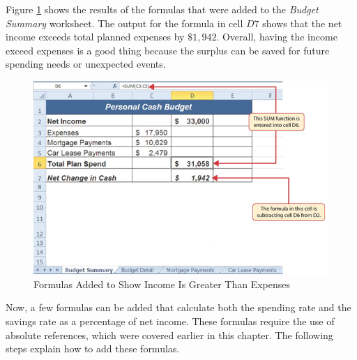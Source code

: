 Figure \ref{02:fig38} shows the results of the formulas that were added to the \textit{Budget Summary} worksheet. The output for the formula in cell $ D7 $ shows that the net income exceeds total planned expenses by $ \$1,942 $. Overall, having the income exceed expenses is a good thing because the surplus can be saved for future spending needs or unexpected events.

\begin{figure}[H]
	\centering
	\includegraphics[width=\maxwidth{.95\linewidth}]{gfx/ch02_fig38}
	\caption{Formulas Added to Show Income Is Greater Than Expenses}
	\label{02:fig38}
\end{figure}

Now, a few formulas can be added that calculate both the spending rate and the savings rate as a percentage of net income. These formulas require the use of absolute references, which were covered earlier in this chapter. The following steps explain how to add these formulas.

